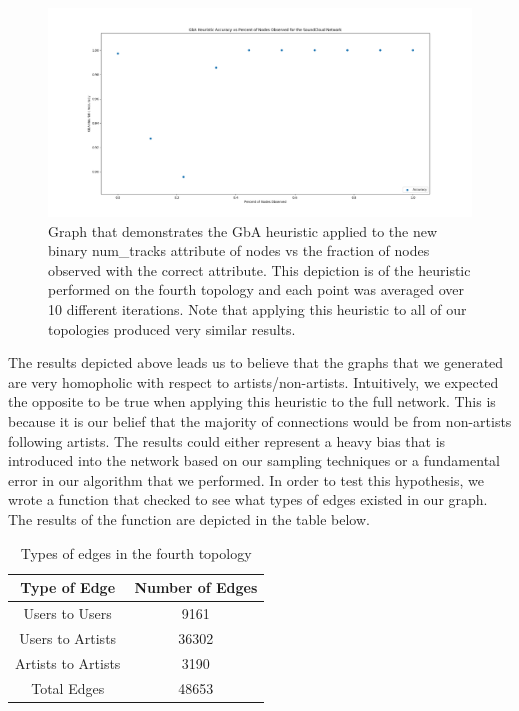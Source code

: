 \documentclass{article}
\begin{document}
\begin{figure}[h]
	\centering
	\includegraphics[scale=0.29]{take_4_gba_2}
	\caption{Graph that demonstrates the GbA heuristic applied to the new binary num\_tracks attribute of nodes vs the fraction of nodes observed with the correct attribute.  This depiction is of the heuristic performed on the fourth topology and each point was averaged over 10 different iterations.  Note that applying this heuristic to all of our topologies produced very similar results.}
\end{figure}

The results depicted above leads us to believe that the graphs that we generated are very homopholic with respect to artists/non-artists.  Intuitively, we expected the opposite to be true when applying this heuristic to the full network.  This is because it is our belief that the majority of connections would be from non-artists following artists.  The results could either represent a heavy bias that is introduced into the network based on our sampling techniques or a fundamental error in our algorithm that we performed.  In order to test this hypothesis, we wrote a function that checked to see what types of edges existed in our graph.  The results of the function are depicted in the table below.

\begin{table}[h!]
	\centering
	\begin{tabular}{||c c||} 
		\hline
		Type of Edge & Number of Edges \\ [0.5ex] 
		\hline\hline
		Users to Users & 9161 \\
		\hline
		Users to Artists & 36302 \\ 
		\hline
		Artists to Artists & 3190 \\
		\hline
		Total Edges & 48653 \\
		\hline
	\end{tabular}
	\caption{Types of edges in the fourth topology}
	\label{Table:3}
\end{table}
\end{document}
